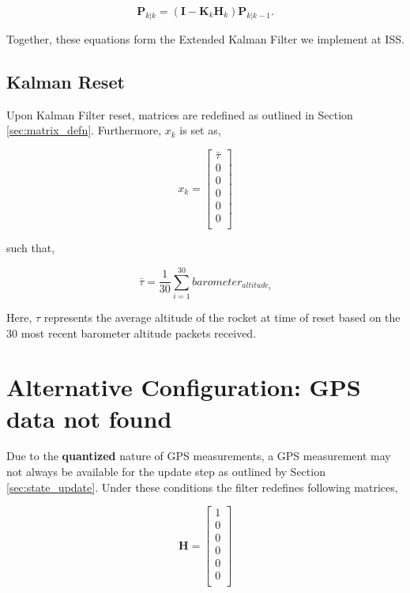 \documentclass{article}
\begin{document}
\begin{equation}
    \mathbf{P}_{k|k} =
    (\mathbf{I} - \mathbf{K}_k\mathbf{H}_k)
    \mathbf{P}_{k|k-1}.
    \label{eq:covariance_update}
\end{equation}

Together, these equations form the Extended Kalman Filter we implement at ISS.  



\subsection{Kalman Reset} 

Upon Kalman Filter reset, matrices are redefined as outlined in Section \ref{sec:matrix_defn}. Furthermore, $x_k$ is set as, 

\begin{equation}
    x_k =\begin{bmatrix}
        \bar{\tau} \\
        0 \\
        0\\
        0\\
        0\\
        0\\
        
    \end{bmatrix}
\end{equation}

such that, 

\begin{equation}
\bar{\tau} = \frac{1}{30}\sum_{i=1}^{30} barometer_{altitude_i} 
\end{equation}

Here, $\tau$ represents the average altitude of the rocket at time of reset based on the 30 most recent barometer altitude packets received. 

\label{sec:reset}

\section{Alternative Configuration: GPS data not found }
\label{sec:gps_not}
Due to the \textbf{quantized} nature of GPS measurements, a GPS measurement may not always be available for the update step as outlined by Section \ref{sec:state_update}. Under these conditions the filter redefines following matrices, 

\begin{equation}
\mathbf{H} =  
\begin{bmatrix}
        1 \\ 
        0 \\
        0\\
        0\\
        0  \\      
        0 \\      
\end{bmatrix}
\end{equation}
\end{document}
